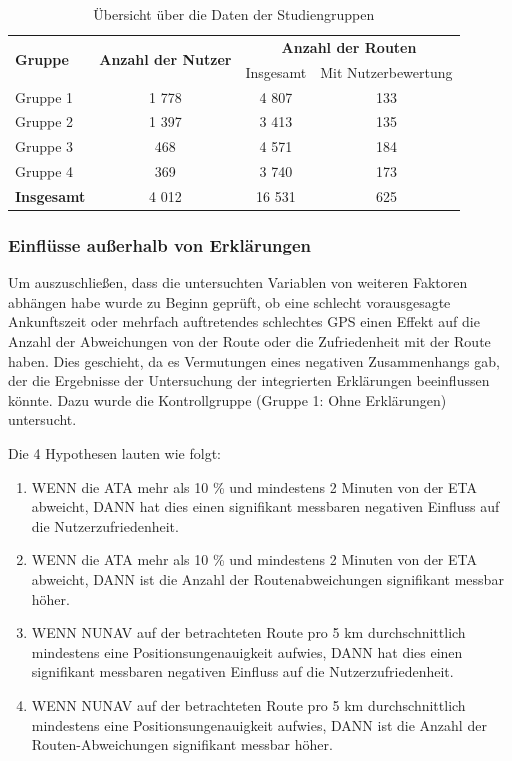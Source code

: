 \begin{table}
    \begin{center}
        \begin{tabular}{|l|c|c|c|}
            \hline
            \multirow{2}{*}{\textbf{Gruppe}} & \multirow{2}{*}{\textbf{Anzahl der Nutzer}} & \multicolumn{2}{|c|}{\textbf{Anzahl der Routen}} \\ \cline{3-4}
            & & Insgesamt & Mit Nutzerbewertung \\ \hline \hline
            Gruppe 1            & 1 778  & 4 807  & 133 \\ \hline
            Gruppe 2            & 1 397  & 3 413  & 135 \\ \hline
            Gruppe 3            & 468   & 4 571  & 184 \\ \hline
            Gruppe 4            & 369   & 3 740  & 173 \\ \hline \hline
            \textbf{Insgesamt}  & 4 012  & 16 531 & 625 \\ \hline
        \end{tabular}
    \end{center}
    \caption{Übersicht über die Daten der Studiengruppen}
    \label{tab:study_user_group_overview}
\end{table}

\subsubsection{Einflüsse außerhalb von Erklärungen}

Um auszuschließen, dass die untersuchten Variablen von weiteren Faktoren abhängen habe wurde zu Beginn geprüft, ob eine schlecht vorausgesagte Ankunftszeit oder mehrfach auftretendes schlechtes GPS einen Effekt auf die Anzahl der Abweichungen von der Route oder die Zufriedenheit mit der Route haben. Dies geschieht, da es Vermutungen eines negativen Zusammenhangs gab, der die Ergebnisse der Untersuchung der integrierten Erklärungen beeinflussen könnte. Dazu wurde die Kontrollgruppe (Gruppe 1: Ohne Erklärungen) untersucht.

Die 4 Hypothesen lauten wie folgt:

\begin{enumerate}
    \item[1.1] WENN die ATA mehr als 10 \% und mindestens 2 Minuten von der ETA abweicht, DANN hat dies einen signifikant messbaren negativen Einfluss auf die Nutzerzufriedenheit.
    \item[1.2] WENN die ATA mehr als 10 \% und mindestens 2 Minuten von der ETA abweicht, DANN ist die Anzahl der Routenabweichungen signifikant messbar höher.
    \item[1.3] WENN NUNAV auf der betrachteten Route pro 5 km durchschnittlich mindestens eine Positionsungenauigkeit aufwies, DANN hat dies einen signifikant messbaren negativen Einfluss auf die Nutzerzufriedenheit.
    \item[1.4] WENN NUNAV auf der betrachteten Route pro 5 km durchschnittlich mindestens eine Positionsungenauigkeit aufwies, DANN ist die Anzahl der Routen-Abweichungen signifikant messbar höher.
\end{enumerate}

